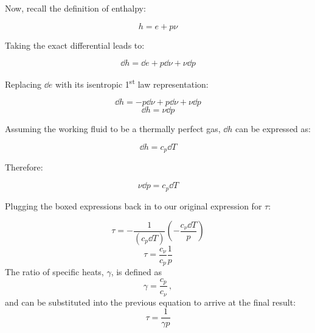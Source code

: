 \documentclass[12pt,letterpaper]{article}
\begin{document}
\begin{enumerate}[label=(\alph*)]
\begin{enumerate}[label=\arabic*.]
					Now, recall the definition of enthalpy:
					
					\begin{equation*}
						h = e + p\nu
					\end{equation*}
					
					Taking the exact differential leads to:
					
					\begin{equation*}
						\dd h = \dd e + p\dd \nu + \nu \dd p
					\end{equation*}
					
					Replacing $\dd e$ with its isentropic 1\textsuperscript{st} law representation:
						
					\begin{equation*}
						\dd h = -p\dd \nu + p\dd\nu + \nu \dd p
					\end{equation*}
					\begin{equation*}
						\dd h = \nu \dd p
					\end{equation*}
				
					Assuming the working fluid to be a thermally perfect gas, $\dd h$ can be expressed as:
					
					\begin{equation*}
						\dd h = c_p \dd T
					\end{equation*}
					
					Therefore:
					
					\begin{equation*}
						\boxed{\nu \dd p = c_p \dd T}
					\end{equation*}
				
				
					Plugging the boxed expressions back in to our original expression for $\tau$: 
					
					\begin{equation*}
						\tau = - \frac{1}{\left(c_{p}\dd T\right)} \left(-\frac{c_{\nu}\dd T}{p}\right)
					\end{equation*}
					\begin{equation*}
						\tau = \frac{c_{\nu}}{c_p}\frac{1}{p}
					\end{equation*}
					The ratio of specific heats, $\gamma$, is defined as
					\begin{equation*}
						\gamma = \frac{c_p}{c_{\nu}}\,,
					\end{equation*}
					and can be substituted into the previous equation to arrive at the final result:
					\begin{equation*}
						\boxed{\tau = \frac{1}{\gamma p}}
					\end{equation*}


\end{enumerate}
\end{enumerate}
\end{document}
